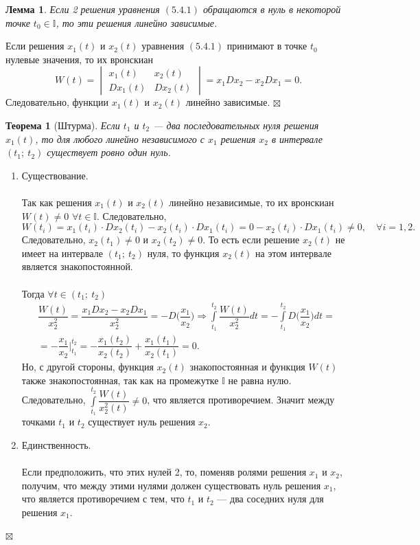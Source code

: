 \documentclass[a4paper, 12pt]{report}
\newenvironment{Proof} %
{\par\noindent{$\blacklozenge$}} %
{\hfill$\scriptstyle\boxtimes$}
\newcommand{\I}{\mathbb{I}}
\newtheorem*{theorem}{Теорема}
\newtheorem*{lem}{Лемма}
\begin{document}
\begin{lem}
	Если 2 решения уравнения $(5.4.1)$ обращаются в нуль в некоторой точке $t_0 \in \I$, то эти решения линейно зависимые.
\end{lem}\begin{Proof}
Если решения $x_1(t)$ и $x_2(t)$ уравнения $(5.4.1)$ принимают в точке $t_0$ нулевые значения, то их вронскиан $$W(t) = \begin{vmatrix}
	x_1(t) & x_2(t)\\
	Dx_1(t) & Dx_2(t)
\end{vmatrix} = x_1Dx_2 - x_2Dx_1 = 0.$$
Следовательно, функции $x_1(t)$ и $x_2(t)$ линейно зависимые.
\end{Proof}
\begin{theorem}
	[Штурма]
	Если $t_1$ и $t_2$ --- два последовательных нуля решения $x_1(t)$, то для любого линейно независимого с $x_1$ решения $x_2$ в интервале $(t_1;\ t_2)$ существует ровно один нуль.
\end{theorem}\begin{Proof}
\begin{enumerate}
	\item Существование.\\\\
	Так как решения $x_1(t)$ и $x_2(t)$ линейно независимые, то их вронскиан $W(t) \ne 0$ $\forall t \in \I$. Следовательно, $$W(t_i) = x_1(t_i)\cdot Dx_2(t_i) - x_2(t_i)\cdot Dx_1(t_i) = 0 - x_2(t_i)\cdot Dx_1(t_i) \ne 0,\quad \forall i = 1,2.$$
	Следовательно, $x_2(t_1) \ne 0$ и $x_2(t_2) \ne 0$. То есть если решение $x_2(t)$ не имеет на интервале  $(t_1;\ t_2)$ нуля, то функция $x_2(t)$ на этом интервале является знакопостоянной.\\\\
	Тогда $\forall t \in (t_1;\ t_2)$
	\begin{multline*}
		\dfrac{W(t)}{x_2^2} = \dfrac{x_1Dx_2 - x_2Dx_1}{x_2^2} = -D\Big(\dfrac{x_1}{x_2}\Big) \Rightarrow \int\limits_{t_1}^{t_2} \dfrac{W(t)}{x_2^2} dt = - \int\limits_{t_1}^{t_2} D\Big(\dfrac{x_1}{x_2}\Big)dt =\\= -\dfrac{x_1}{x_2}\Big|_{t_1}^{t_2} = -\dfrac{x_1(t_2)}{x_2(t_2)} + \dfrac{x_1(t_1)}{x_2(t_1)} = 0.
	\end{multline*}
Но, с другой стороны, функция $x_2(t)$ знакопостоянная и функция $W(t)$ также знакопостоянная, так как на промежутке $\I$ не равна нулю. Следовательно, $\int\limits_{t_1}^{t_2}\dfrac{W(t)}{x_2^2(t)} \ne 0$, что является противоречием. Значит между точками $t_1$ и $t_2$ существует нуль решения $x_2$.
\item Единственность.\\\\
Если предположить, что этих нулей 2, то, поменяв ролями решения $x_1$ и $x_2$, получим, что между этими нулями должен существовать нуль решения $x_1$, что является противоречием с тем, что $t_1$ и $t_2$ --- два соседних нуля для решения $x_1$.
\end{enumerate}
\end{Proof}
\end{document}
